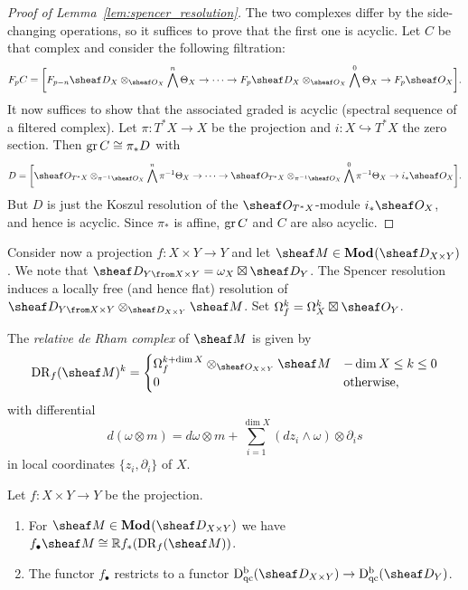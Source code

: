 \documentclass[number-in-sections,a4paper]{notes}
\begin{document}
\begin{proof}[Proof of Lemma~\ref{lem:spencer_resolution}]
    The two complexes differ by the side-changing operations, so it suffices to prove that the first one is acyclic.
    Let $C$ be that complex and consider the following filtration:
    \[
        F_pC = \biggl[
            F_{p-n}\sD_{X} \otimes_{\sO_X} \bigwedge^n \tb X \to
            \dots \to
            F_p \sD_{X} \otimes_{\sO_X} \bigwedge^0 \tb X \to
            F_p \sO_X
        \biggr].
    \]
    It now suffices to show that the associated graded is acyclic (spectral sequence of a filtered complex).
    Let $\pi \colon T^*X \to X$ be the projection and $i\colon X \hookrightarrow T^*X$ the zero section.
    Then $\operatorname{gr} C \cong \pi_* D$ with
    \[
        D = \biggl[
            \sO_{T^*X} \otimes_{\pi^{-1}\sO_X} \bigwedge^n \pi^{-1}\tb X \to
            \dots \to
            \sO_{T^*X} \otimes_{\pi^{-1}\sO_X} \bigwedge^0 \pi^{-1}\tb X \to
            i_*\sO_X
        \biggr].
    \]
    But $D$ is just the Koszul resolution of the $\sO_{T^*X}$-module $i_*\sO_X$, and hence is acyclic.
    Since $\pi_*$ is affine, $\operatorname{gr} C$ and $C$ are also acyclic.
\end{proof}

Consider now a projection $f\colon X \times Y \to Y$ and let $\sheaf M \in \catDMod{X \times Y}$.
We note that $\sD_{Y \from X \times Y} = \canon_X \boxtimes \sD_Y$.
The Spencer resolution induces a locally free (and hence flat) resolution of $\sD_{Y \from X \times Y} \otimes_{\sD_{X \times Y}} \sheaf M$.
Set $\Omega_f^k = \Omega_X^k \boxtimes \sO_Y$.

\begin{Definition}
    The \emph{relative de Rham complex} of $\sheaf M$ is given by
    \[
        \DR_f(\sheaf M)^k =
        \begin{cases}
            \Omega_f^{k + \dim X} \otimes_{\sO_{X \times Y}} \sheaf M & -\dim X \le k \le 0 \\
            0 & \text{otherwise},
        \end{cases}
    \]
    with differential 
    \[
        d(\omega \otimes m) = d\omega \otimes m + \sum_{i=1}^{\dim X} (dz_i \wedge \omega) \otimes \partial_i s
    \]
    in local coordinates $\{z_i, \partial_i\}$ of $X$.
\end{Definition}

\begin{Corollary}
    Let $f\colon X \times Y \to Y$ be the projection.
    \begin{enumerate}
        \item For $\sheaf M \in \catDMod{X \times Y}$ we have $f_\bullet\sheaf M \cong \RR f_*(\DR_f(\sheaf M))$.
        \item The functor $f_\bullet$ restricts to a functor $\catDbDModqc{X \times Y} \to \catDbDModqc{Y}$.
    \end{enumerate}
\end{Corollary}
\end{document}
